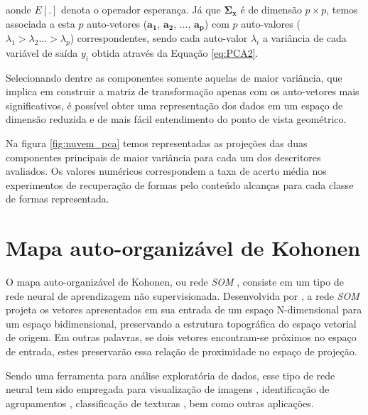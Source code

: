  aonde $E[.]$ denota o operador esperança. 
Já que $\mathbf{\Sigma_x}$ é de dimensão $p \times p$, temos associada a esta $p$ auto-vetores ($\mathbf{a_1}\text{, }\mathbf{a_2}\text{, }\ldots\text{, }\mathbf{a_p}$) com $p$ auto-valores ($\lambda_1 > \lambda_2 \ldots > \lambda_p$) correspondentes, sendo cada auto-valor $\lambda_i$ a variância de cada variável de saída $y_i$ obtida através da Equação \ref{eq:PCA2}. 

Selecionando dentre as componentes somente aquelas de maior variância, que implica em construir a matriz de transformação apenas com os auto-vetores mais significativos, é possível obter uma representação dos dados em um espaço de dimensão reduzida e de mais fácil entendimento do ponto de vista geométrico.

Na figura \ref{fig:nuvem_pca} temos representadas as projeções das duas componentes principais de maior variância para cada um dos descritores avaliados. Os valores numéricos correspondem a taxa de acerto média nos experimentos de recuperação de formas pelo conteúdo alcanças para cada classe de formas representada.

\section{Mapa auto-organizável de Kohonen}

O mapa auto-organizável de Kohonen, ou rede \emph{SOM} \cite{Kohonen:2001}, consiste em um tipo de rede neural de aprendizagem não supervisionada. Desenvolvida por , a rede \emph{SOM} projeta os vetores apresentados em sua entrada de um espaço N-dimensional para um espaço bidimensional, preservando a estrutura topográfica do espaço vetorial de origem. Em outras palavras, se dois vetores encontram-se próximos no espaço de entrada, estes preservarão essa relação de proximidade no espaço de projeção. 

\begin{comment}
Em seu processo de treinamento, a rede \emph{SOM} agrupa os vetores de entrada através de um processo de aprendizado competitivo mantendo a estrutura topológica do espaço vetorial de entrada.
\end{comment}

Sendo uma ferramenta para análise exploratória de dados, esse tipo de rede neural tem sido empregada para visualização de imagens \cite{Strong2011774}, identificação de agrupamentos \cite{Kuroiwa200031}, classificação de texturas \cite{595364}, bem como outras aplicações.

